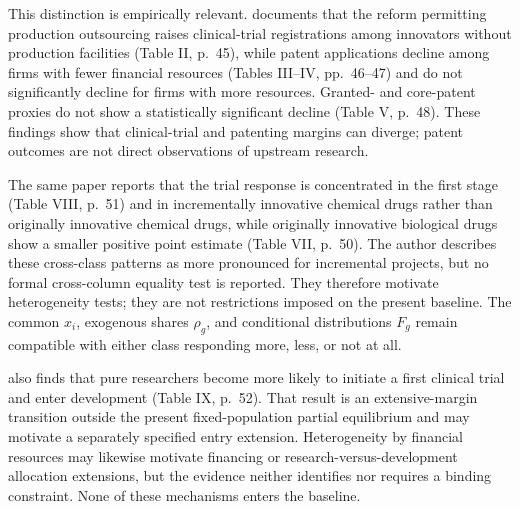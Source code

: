 \documentclass[11pt]{article}
\newcommand{\1}{\mathbf{1}}
\begin{document}
This distinction is empirically relevant. \citet{Gu2024} documents that the
reform permitting production outsourcing raises clinical-trial registrations
among innovators without production facilities (Table II, p.~45), while
patent applications decline among firms with fewer financial resources
(Tables III--IV, pp.~46--47) and do not significantly decline for firms with
more resources. Granted- and core-patent proxies do not show a statistically
significant decline (Table V, p.~48). These findings show that clinical-trial
and patenting margins can diverge; patent outcomes are not direct
observations of upstream research.

The same paper reports that the trial response is concentrated in the first
stage (Table VIII, p.~51) and in incrementally innovative chemical drugs
rather than originally innovative chemical drugs, while originally
innovative biological drugs show a smaller positive point estimate (Table
VII, p.~50). The author describes these cross-class patterns as more
pronounced for incremental projects, but no formal cross-column equality test
is reported. They therefore motivate heterogeneity tests; they are not
restrictions imposed on the present baseline. The common \(x_i\), exogenous
shares \(\rho_g\), and conditional distributions \(F_g\) remain compatible
with either class responding more, less, or not at all.

\citet{Gu2024} also finds that pure researchers become more likely to
initiate a first clinical trial and enter development (Table IX, p.~52).
That result is an extensive-margin transition outside the present
fixed-population partial equilibrium and may motivate a separately specified
entry extension. Heterogeneity by financial resources may likewise motivate
financing or research-versus-development allocation extensions, but the
evidence neither identifies nor requires a binding constraint. None of these
mechanisms enters the baseline.



\clearpage


\end{document}

